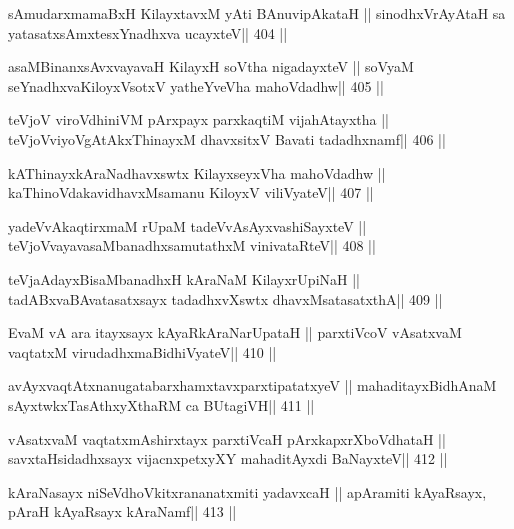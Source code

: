 \begin{shl}
sAmudarxmamaBxH KilayxtavxM yAti BAnuvipAkataH ||
sinodhxVrAyAtaH sa yatasatxsAmxtesxYnadhxva ucayxteV\hfill || 404 ||
\end{shl}

\begin{shl}
asaMBinanxsAvxvayavaH KilayxH soV\s tha nigadayxteV ||
soV\s yaM seYnadhxvaKiloyxV\s sotxV yatheYveVha mahoVdadhw\hfill || 405 ||
\end{shl}

\begin{shl}
teVjoV viroVdhiniVM pArxpayx parxkaqtiM vijahAtayxtha ||
teVjoVviyoVgAtAkxThinayxM dhavxsitxV Bavati tadadhxnamf\hfill || 406 ||
\end{shl}

\begin{shl}
kAThinayxkAraNadhavxswtx KilayxseyxVha mahoVdadhw ||
kaThinoVdakavidhavxMsamanu KiloyxV viliVyateV\hfill || 407 ||
\end{shl}

\begin{shl}
yadeVvAkaqtirxmaM rUpaM tadeVvAsAyxvashiSayxteV ||
teVjoVvayavasaMbanadhxsamutathxM vinivataRteV\hfill || 408 ||
\end{shl}

\begin{shl}
teVjaAdayxBisaMbanadhxH kAraNaM KilayxrUpiNaH ||
tadABxvaBAvatasatxsayx tadadhxvXswtx dhavxMsatasatxthA\hfill || 409 ||
\end{shl}

\begin{shl}
EvaM vA ara itayxsayx kAyaRkAraNarUpataH ||
parxtiVcoV vAsatxvaM vaqtatxM virudadhxmaBidhiVyateV\hfill || 410 ||
\end{shl}

\begin{shl}
avAyxvaqtAtxnanugatabarxhamxtavxparxtipatatxyeV ||
mahaditayxBidhAnaM sAyxtwkxTasAthxyXthaRM ca BUtagiVH\hfill || 411 ||
\end{shl}

\begin{shl}
vAsatxvaM vaqtatxmAshirxtayx parxtiVcaH pArxkapxrXboVdhataH ||
savxtaHsidadhxsayx vijacnxpetxyXY mahaditAyxdi BaNayxteV\hfill || 412 ||
\end{shl}

\begin{shl}
kAraNasayx niSeVdhoVkitxrananatxmiti yadavxcaH ||
apAramiti kAyaRsayx, pAraH kAyaRsayx kAraNamf\hfill || 413 ||
\end{shl}

